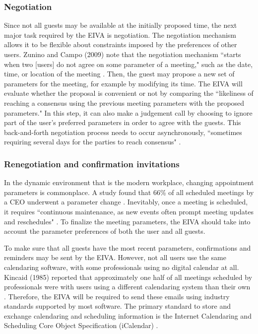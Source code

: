 \documentclass{article}
\begin{document}
\subsubsection{Negotiation}

Since not all guests may be available at the initially proposed time, the next major task required by the EIVA is negotiation. The negotiation mechanism allows it to be flexible about constraints imposed by the preferences of other users. Zunino and Campo (2009) note that the negotiation mechanism ``starts when two [users] do not agree on some parameter of a meeting," such as the date, time, or location of the meeting \cite{zunino_chronos_2009}. Then, the guest may propose a new set of parameters for the meeting, for example by modifying its time. The EIVA will evaluate whether the proposal is convenient or not by comparing the ``likeliness of reaching a consensus using the previous meeting parameters with the proposed parameters." In this step, it can also make a judgement call by choosing to ignore part of the user's preferred parameters in order to agree with the guests. This back-and-forth negotiation process needs to occur asynchronously, ``sometimes requiring several days for the parties to reach consensus" \cite{cranshaw_calendarhelp_2017}.

\subsubsection{Renegotiation and confirmation invitations}

In the dynamic environment that is the modern workplace, changing appointment parameters is commonplace. A study found that 66\% of all scheduled meetings by a CEO underwent a parameter change \cite{dennis_how_2018}. Inevitably, once a meeting is scheduled, it requires ``continuous maintenance, as new events often prompt meeting updates and reschedules" \cite{cranshaw_calendarhelp_2017}. To finalize the meeting parameters, the EIVA should take into account the parameter preferences of both the user and all guests.

To make sure that all guests have the most recent parameters, confirmations and reminders may be sent by the EIVA. However, not all users use the same calendaring software, with some professionals using no digital calendar at all. Kincaid (1985) reported that approximately one half of all meetings scheduled by professionals were with users using a different calendaring system than their own \cite{kincaid_electronic_1985}. Therefore, the EIVA will be required to send these emails using industry standards supported by most software. The primary standard to store and exchange calendaring and scheduling information is the Internet Calendaring and Scheduling Core Object Specification (iCalendar) \cite{desruisseaux_internet_2009}.
\end{document}

